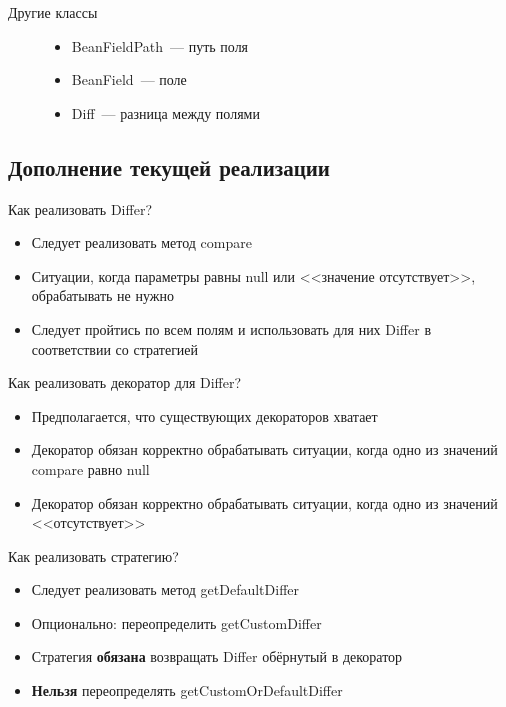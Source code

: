 \documentclass{beamer}
\begin{document}
\begin{frame}{Другие классы}
    \begin{figure}
        \pause
        \begin{itemize}
            \item {BeanFieldPath~--- путь поля \pause}
            \item {BeanField~--- поле \pause}
            \item {Diff~--- разница между полями}
        \end{itemize}
    \end{figure}
\end{frame}

\subsection{Дополнение текущей реализации}

\begin{frame}{Как реализовать Differ?}
    \pause
    \begin{itemize}
        \item {Следует реализовать метод compare \pause}
        \item {Ситуации, когда параметры равны null или <<значение отсутствует>>, обрабатывать не нужно \pause}
        \item {Следует пройтись по всем полям и использовать для них Differ в соответствии со стратегией}
    \end{itemize}
\end{frame}

\begin{frame}{Как реализовать декоратор для Differ?}
    \pause
    \begin{itemize}
        \item {Предполагается, что существующих декораторов хватает \pause}
        \item {Декоратор обязан корректно обрабатывать ситуации, когда одно из значений compare равно null \pause}
        \item {Декоратор обязан корректно обрабатывать ситуации, когда одно из значений <<отсутствует>>}
    \end{itemize}
\end{frame}

\begin{frame}{Как реализовать стратегию?}
    \pause
    \begin{itemize}
        \item {Следует реализовать метод getDefaultDiffer \pause}
        \item {Опционально: переопределить getCustomDiffer \pause}
        \item {Стратегия \textbf{обязана} возвращать Differ обёрнутый в декоратор \pause}
        \item {\textbf{Нельзя} переопределять getCustomOrDefaultDiffer}
    \end{itemize}
\end{frame}
\end{document}

